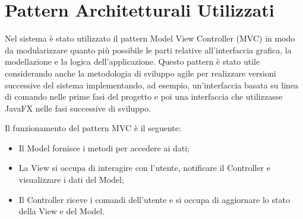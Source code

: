     \section{Pattern Architetturali Utilizzati}
        Nel sistema è stato utilizzato il pattern Model View Controller (MVC) in modo da modularizzare quanto più possibile le parti relative all'interfaccia grafica, la modellazione e la logica dell'applicazione. 
        Questo pattern è stato utile considerando anche la metodologia di sviluppo agile per realizzare versioni successive del sistema implementando, ad esempio, un'interfaccia basata su linea di comando nelle prime fasi del progetto e poi una interfaccia che utilizzasse JavaFX nelle fasi successive di sviluppo.
        
        Il funzionamento del pattern MVC è il seguente:
        \begin{itemize}
            \item Il Model fornisce i metodi per accedere ai dati;
            \item La View si occupa di interagire con l'utente, notificare il Controller e visualizzare i dati del Model;
            \item Il Controller riceve i comandi dell'utente e si occupa di aggiornare lo stato della View e del Model.
        \end{itemize}
    